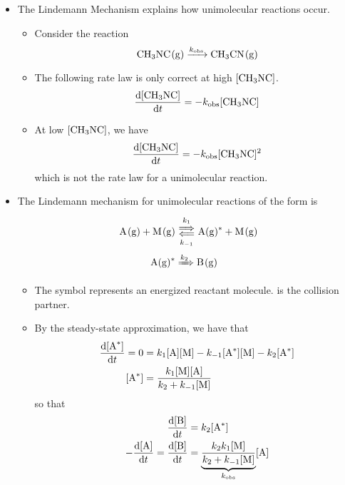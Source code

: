 \documentclass[../notes.tex]{subfiles}
\begin{document}
\begin{itemize}
\begin{itemize}
    \end{itemize}
    \item The Lindemann Mechanism explains how unimolecular reactions occur.
    \begin{itemize}
        \item Consider the reaction
        \begin{equation*}
            \ce{CH3NC(g) ->[$k_\text{obs}$] CH3CN(g)}
        \end{equation*}
        \item The following rate law is only correct at high $[\ce{CH3NC}]$.
        \begin{equation*}
            \dv{[\ce{CH3NC}]}{t} = -k_\text{obs}[\ce{CH3NC}]
        \end{equation*}
        \item At low $[\ce{CH3NC}]$, we have
        \begin{equation*}
            \dv{[\ce{CH3NC}]}{t} = -k_\text{obs}[\ce{CH3NC}]^2
        \end{equation*}
        which is not the rate law for a unimolecular reaction.
    \end{itemize}
    \item The Lindemann mechanism for unimolecular reactions of the form  is
    \begin{align*}
        \ce{A(g) + M(g)} &\Longleftrightarrows[k_1][k_{-1}] \ce{A(g)^* + M(g)}\\
        \ce{A(g)^*} &\xRightarrow{k_2} \ce{B(g)}
    \end{align*}
    \begin{itemize}
        \item The symbol  represents an energized reactant molecule.  is the collision partner.
        \item By the steady-state approximation, we have that
        \begin{align*}
            \dv{[\ce{A^*}]}{t} = 0 &= k_1[\ce{A}][\ce{M}]-k_{-1}[\ce{A^*}][\ce{M}]-k_2[\ce{A^*}]\\
            [\ce{A^*}] &= \frac{k_1[\ce{M}][\ce{A}]}{k_2+k_{-1}[\ce{M}]}
        \end{align*}
        so that
        \begin{align*}
            \dv{[\ce{B}]}{t} &= k_2[\ce{A^*}]\\
            -\dv{[\ce{A}]}{t} = \dv{[\ce{B}]}{t} &= \underbrace{\frac{k_2k_1[\ce{M}]}{k_2+k_{-1}[\ce{M}]}}_{k_\text{obs}}[\ce{A}]
        \end{align*}

\end{itemize}
\end{itemize}
\end{document}
